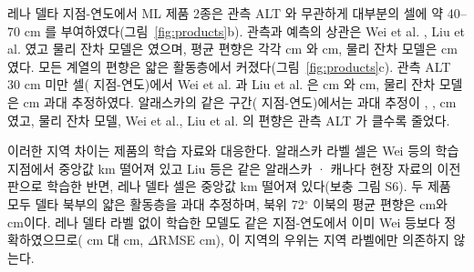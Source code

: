 레나 델타 지점-연도에서 ML 제품 2종은 관측 ALT 와 무관하게 대부분의 셀에 약 40--70 cm 를 부여하였다(그림~\ref{fig:products}b). 관측과 예측의 상관은 Wei et al. \nrLeWei, Liu et al. \nrLeLiu{}였고 물리 잔차 모델은 \nrLeRo{}였으며, 평균 편향은 각각 \nbiasLeAllWei{} cm 와 \nbiasLeAllLiu{} cm, 물리 잔차 모델은 \nbiasLeAllRo{} cm 였다. 모든 계열의 편향은 얇은 활동층에서 커졌다(그림~\ref{fig:products}c). 관측 ALT 30 cm 미만 셀(\nthinNLe{} 지점-연도)에서 Wei et al. 과 Liu et al. 은 \nbiasLeThinWei{} cm 와 \nbiasLeThinLiu{} cm, 물리 잔차 모델은 \nbiasLeThinRo{} cm 과대 추정하였다. 알래스카의 같은 구간(\nthinNAk{} 지점-연도)에서는 과대 추정이 \nbiasAkThinWei{}, \nbiasAkThinLiu{}, \nbiasAkThinRo{} cm 였고, 물리 잔차 모델, Wei et al., Liu et al. 의 편향은 관측 ALT 가 클수록 줄었다.


이러한 지역 차이는 제품의 학습 자료와 대응한다. 알래스카 라벨 셀은 Wei 등의 학습 지점에서 중앙값 \ndistweiAkmed{} km 떨어져 있고 Liu 등은 같은 알래스카 · 캐나다 현장 자료의 이전 판으로 학습한 반면, 레나 델타 셀은 중앙값 \ndistweiLemed{} km 떨어져 있다(보충 그림 S6). 두 제품 모두 델타 북부의 얇은 활동층을 과대 추정하며, 북위 72$^\circ$ 이북의 평균 편향은 \nbiasLeNorthWei{} cm와 \nbiasLeNorthLiu{} cm이다. 레나 델타 라벨 없이 학습한 모델도 같은 지점-연도에서 이미 Wei 등보다 정확하였으므로(\ntlvprmseLeRsWeizero{} cm 대 \ntlvprmseLeWeizero{} cm, $\Delta$RMSE \ntlvpLeRsWeizero{} cm), 이 지역의 우위는 지역 라벨에만 의존하지 않는다.

